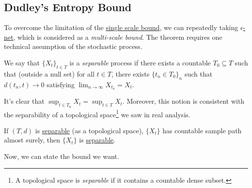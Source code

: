 \subsection{Dudley's Entropy Bound}
To overcome the limitation of the \hyperref[lma:single-scale-bound]{single scale bound}, we can repeatedly taking \hyperref[def:eps-net]{\(\epsilon\)-net}, which is considered as a \emph{multi-scale bound}. The theorem requires one technical assumption of the stochastic process.

\begin{definition}[Separable]\label{def:separable}
	We say that \(\{X_t\}_{t\in T}\) is a \emph{separable} process if there exists a countable \(T_0 \subseteq T\) such that (outside a null set) for all \(t\in T\), there exists \(\{t_n \in T_0\}_{n}\) such that \(d(t_n, t) \to 0\) satisfying \(\lim_{n \to \infty} X_{t_n} = X_t\).
\end{definition}

It's clear that \(\sup _{t\in T_0} X_t = \sup _{t\in T} X_t\). Moreover, this notion is consistent with the separability of a topological space\footnote{A topological space is \emph{separable} if it contains a countable dense subset.} we saw in real analysis.

\begin{eg}
	If \((T, d)\) is \hyperref[prev:separable]{separable} (as a topological space), \(\{ X_t \} \) has countable sample path almost surely, then \(\{ X_t \} \) is \hyperref[def:separable]{separable}.
\end{eg}

Now, we can state the bound we want.

